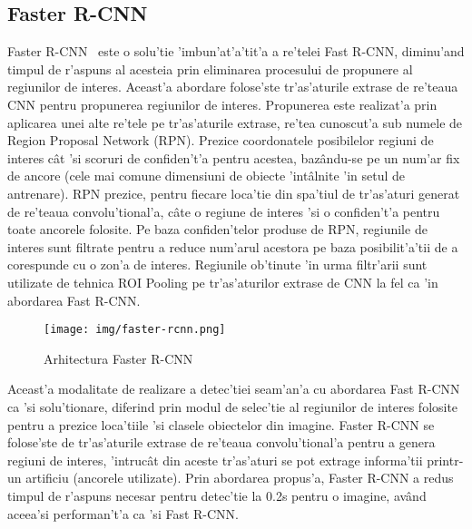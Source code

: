 \documentclass[12pt,a4paper,twoside]{report}
\begin{document}
\subsection{Faster R-CNN}
Faster R-CNN~\cite{FasterR-CNN} este o solu'tie 'imbun'at'a'tit'a a re'telei Fast R-CNN, diminu'and timpul de r'aspuns al acesteia prin eliminarea procesului de propunere al regiunilor de interes. Aceast'a abordare folose'ste tr'as'aturile extrase de re'teaua CNN pentru propunerea regiunilor de interes. Propunerea este realizat'a prin aplicarea unei alte re'tele pe tr'as'aturile extrase, re'tea cunoscut'a sub numele de Region Proposal Network (RPN). Prezice coordonatele posibilelor regiuni de interes c\^at 'si scoruri de confiden't'a pentru acestea, baz\^andu-se pe un num'ar fix de ancore (cele mai comune dimensiuni de obiecte 'int\^alnite 'in setul de antrenare). RPN prezice, pentru fiecare loca'tie din spa'tiul de tr'as'aturi generat de re'teaua convolu'tional'a, c\^ate o regiune de interes 'si o confiden't'a pentru toate ancorele folosite. Pe baza confiden'telor produse de RPN, regiunile de interes sunt filtrate pentru a reduce num'arul acestora pe baza posibilit'a'tii de a corespunde cu o zon'a de interes. Regiunile ob'tinute 'in urma filtr'arii sunt utilizate de tehnica ROI Pooling pe tr'as'aturilor extrase de CNN la fel ca 'in abordarea Fast R-CNN.

\begin{figure}[H]
  \texttt{[image: img/faster-rcnn.png]}
  \centering
  \caption{Arhitectura Faster R-CNN\protect\footnotemark}
\end{figure}

Aceast'a modalitate de realizare a detec'tiei seam'an'a cu abordarea Fast R-CNN ca 'si solu'tionare, diferind prin modul de selec'tie al regiunilor de interes folosite pentru a prezice loca'tiile 'si clasele obiectelor din imagine. Faster R-CNN se folose'ste de tr'as'aturile extrase de re'teaua convolu'tional'a pentru a genera regiuni de interes, 'intruc\^at din aceste tr'as'aturi se pot extrage informa'tii printr-un artificiu (ancorele utilizate). Prin abordarea propus'a, Faster R-CNN a redus timpul de r'aspuns necesar pentru detec'tie la 0.2s pentru o imagine, av\^and aceea'si performan't'a ca 'si Fast R-CNN.
\end{document}
